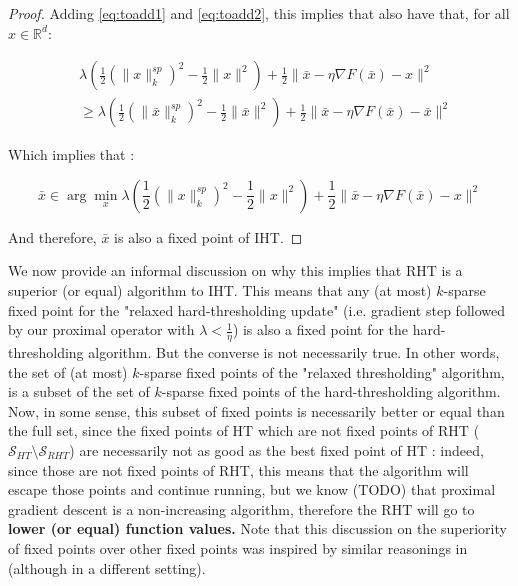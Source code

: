 \documentclass{article}
\begin{document}
\begin{proof}
Adding \eqref{eq:toadd1} and \eqref{eq:toadd2}, this implies that also have that, for all $x \in \mathbb{R}^d$: 

\begin{align*}
     &\lambda  \left(\frac{1}{2} \left(\| x\|^{sp}_k\right)^2 - \frac{1}{2} \|x\|^2 \right)+ \frac{1}{2} \|\bar{x} - \eta \nabla F(\bar{x}) - x \|^2 \\
     &\geq  \lambda \left(\frac{1}{2} \left(\| \bar{x}\|^{sp}_k\right)^2 - \frac{1}{2} \|\bar{x}\|^2 \right)+ \frac{1}{2} \|\bar{x} - \eta \nabla F(\bar{x}) - \bar{x} \|^2
\end{align*}


Which implies that : 

\begin{equation*}
    \bar{x} \in \arg\min_{x} \lambda  \left(\frac{1}{2} \left(\| x\|^{sp}_k\right)^2 - \frac{1}{2} \|x\|^2 \right)+ \frac{1}{2} \|\bar{x} - \eta \nabla F(\bar{x}) - x \|^2 
\end{equation*}

And therefore, $\bar{x}$ is also a fixed point of IHT.


\end{proof}



We now provide an informal discussion on why this implies that RHT is a superior (or equal) algorithm to IHT.
This means that any (at most) $k$-sparse fixed point for the "relaxed hard-thresholding update" (i.e. gradient step followed by our proximal operator with $\lambda < \frac{1}{\eta}$) is also a fixed point for the hard-thresholding algorithm. But the converse is not necessarily true. In other words, the set of (at most) $k$-sparse fixed points of the "relaxed thresholding" algorithm, is a subset of the set of $k$-sparse fixed points of the hard-thresholding algorithm. Now, in some sense, this subset of fixed points is necessarily better or equal than the full set, since the fixed points of HT which are not fixed points of RHT ($\mathcal{S}_{HT} \setminus \mathcal{S}_{RHT}$) are necessarily not as good as the best fixed point of HT : indeed, since those are not fixed points of RHT, this means that the algorithm will escape those points and continue running, but we know (TODO) that proximal gradient descent is a non-increasing algorithm, therefore the RHT will go to \textbf{lower (or equal) function values.}
Note that this discussion on the superiority of fixed points over other fixed points was inspired by similar reasonings in \cite{beck2016minimization} (although in a different setting).
\end{document}
